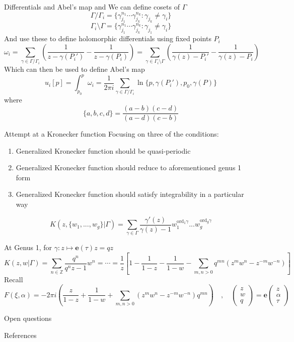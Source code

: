 \documentclass[11pt,aspectratio=169]{beamer}
\newcommand{\ee}[0]{\mathbf{e}}
\begin{document}
\begin{frame}{Differentials and Abel's map}{\tiny \cite{ComputationalSchottky} and \cite{Cha22}}
    We can define cosets of $\Gamma$
    \[\Gamma / \Gamma_i = \{\gamma_{j_1}^{n_1}\cdots \gamma_{j_k}^{n_k}: \gamma_{j_k} \neq \gamma_i\}\]
    \[\Gamma_i \setminus \Gamma  = \{\gamma_{j_1}^{n_1}\cdots \gamma_{j_k}^{n_k}: \gamma_{j_1} \neq \gamma_i\}\]
    And use these to define holomorphic differentials using fixed points $P_i$
    \[\omega_i = \sum_{\gamma \in \Gamma / \Gamma_i} \left(\frac{1}{z-\gamma(P_i')} - \frac{1}{z-\gamma(P_i)}\right) = \sum_{\gamma \in \Gamma_i \setminus \Gamma } \left(\frac{1}{\gamma(z)-P_i'} - \frac{1}{\gamma(z)-P_i}\right)\]
    Which can then be used to define Abel's map
    \[u_i[p] = \int_{p_0}^p \omega_i = \frac{1}{2\pi i} \sum_{\gamma \in \Gamma/\Gamma_i} \ln \{p,\gamma(P_i'),p_0,\gamma(P)\}\]
    where
    \[\{a,b,c,d\} = \frac{(a-b)(c-d)}{(a-d)(c-b)}\]
\end{frame}

\begin{frame}{Attempt at a Kronecker function}{\tiny \cite{Cha22}}
    Focusing on three of the conditions:
    \begin{enumerate}
        \item Generalized Kronecker function should be quasi-periodic
        \item Generalized Kronecker function should reduce to aforementioned genus 1 form
        \item Generalized Kronecker function should satisfy integrability in a particular way
    \end{enumerate}
    \[K(z,\{w_1,...,w_g\}|\Gamma) = \sum_{\gamma \in \Gamma} \frac{\gamma'(z)}{\gamma(z)-1} w_1^{\mathrm{ord}_1\gamma}...w_g^{\mathrm{ord}_g\gamma}\]
    
    At Genus 1, for $\gamma : z \mapsto \ee(\tau) z = qz$
    \[K(z,w|\Gamma) = \sum_{n \in \mathbb Z} \frac{q^n}{q^n z - 1} w^n = \cdots = \frac{1}{z} \left[1 - \frac{1}{1-z} - \frac{1}{1-w} - \sum_{m,n > 0} q^{mn} (z^m w^n - z^{-m} w^{-n})\right]\]
    Recall
    \[F(\xi,\alpha) = -2\pi i \left(\frac{z}{1-z} + \frac{1}{1-w} + \sum_{m,n > 0} (z^m w^n - z^{-m} w^{-n}) q^{mn}\right) \quad , \quad \begin{pmatrix} z \\ w \\ q \end{pmatrix} = \ee \begin{pmatrix}z \\ \alpha \\ \tau\end{pmatrix}\]
\end{frame}

\begin{frame}{Open questions}

\end{frame}

\begin{frame}{References}
    \printbibliography{}
\end{frame}
\end{document}
